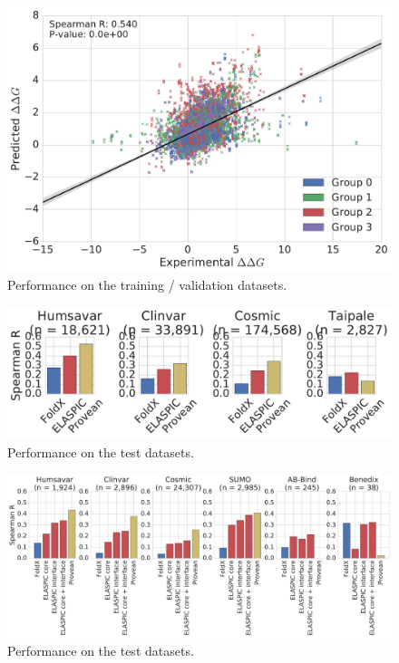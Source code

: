 \begin{figure}[ht]
	\centering
	\includegraphics[width=1.0\linewidth]{static/elaspic_training_set/validation/crossvalidation_performance_core.pdf}
	\caption{Performance on the training / validation datasets.}
\end{figure}

\begin{figure}[ht]
	\centering
	\includegraphics[width=1.0\textwidth]{static/elaspic_training_set/validation/validation_performance_core.pdf}
	\caption{Performance on the test datasets.}
\end{figure}

\begin{figure}[ht]
	\centering
	\includegraphics[width=1.0\textwidth]{static/elaspic_training_set/validation/test_performance_interface.pdf}
	\caption{Performance on the test datasets.}
\end{figure}

